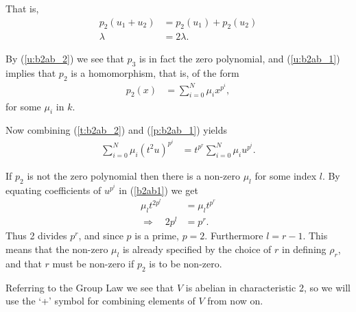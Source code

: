 	That is,
	\begin{align}
	\label{u:b2ab_1}
	p_2(u_1 + u_2) &= p_2(u_1) + p_2(u_2) \\
										\label{u:b2ab_2}
										\lambda &= 2\lambda.
										\end{align}

										By (\ref{u:b2ab_2}) we see that $p_3$ is in fact the zero polynomial, and (\ref{u:b2ab_1}) implies that $p_2$ is a homomorphism, that is, of the form
										\begin{align}
										\label{p:b2ab_1}
										p_2(x) &= \sum_{i=0}^N \mu_i x^{p^i},
										\end{align}
										for some $\mu_i$ in $k$.

										Now combining (\ref{t:b2ab_2}) and (\ref{p:b2ab_1}) yields
										\begin{align}
										\label{b2ab1}
										\sum_{i=0}^N \mu_i (t^2u)^{p^i} &= t^{p^r}\sum_{i=0}^N \mu_i u^{p^i}.
										\end{align}

										If $p_2$ is not the zero polynomial then there is a non-zero $\mu_l$ for some index $l$. By equating coefficients of $u^{p^i}$ in (\ref{b2ab1}) we get
										\begin{align*}
										\mu_lt^{2p^l} &= \mu_lt^{p^r} \\
											\Longrightarrow\quad 2p^l &= p^r.
											\end{align*}
Thus 2 divides $p^r$, and since $p$ is a prime, $p=2$. Furthermore $l=r-1$. This means that the non-zero $\mu_l$ is already specified by the choice of $r$ in defining $\rho_r$, and that $r$ must be non-zero if $p_2$ is to be non-zero.

Referring to the Group Law we see that $V$ is abelian in characteristic 2, so we will use the `+' symbol for combining elements of $V$ from now on.

